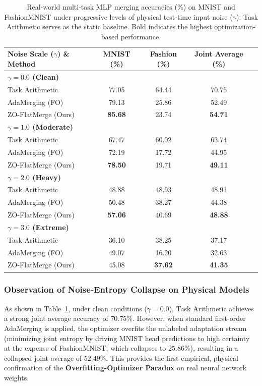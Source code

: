 \begin{table}[h]
\caption{Real-world multi-task MLP merging accuracies (\%) on MNIST and FashionMNIST under progressive levels of physical test-time input noise ($\gamma$). Task Arithmetic serves as the static baseline. Bold indicates the highest optimization-based performance.}
\label{tab:real_mnist_results}
\vskip 0.15in
\begin{center}
\begin{small}
\begin{sc}
\begin{tabular}{lcccc}
\toprule
Noise Scale ($\gamma$) \& Method & MNIST (\%) & Fashion (\%) & Joint Average (\%) \\
\midrule
\textbf{$\gamma = 0.0$ (Clean)} & & & \\
Task Arithmetic & 77.05 & 64.44 & 70.75 \\
AdaMerging (FO) & 79.13 & 25.86 & 52.49 \\
ZO-FlatMerge (Ours) & \textbf{85.68} & 23.74 & \textbf{54.71} \\
\midrule
\textbf{$\gamma = 1.0$ (Moderate)} & & & \\
Task Arithmetic & 67.47 & 60.02 & 63.74 \\
AdaMerging (FO) & 72.19 & 17.72 & 44.95 \\
ZO-FlatMerge (Ours) & \textbf{78.50} & 19.71 & \textbf{49.11} \\
\midrule
\textbf{$\gamma = 2.0$ (Heavy)} & & & \\
Task Arithmetic & 48.88 & 48.93 & 48.91 \\
AdaMerging (FO) & 50.48 & 38.27 & 44.38 \\
ZO-FlatMerge (Ours) & \textbf{57.06} & 40.69 & \textbf{48.88} \\
\midrule
\textbf{$\gamma = 3.0$ (Extreme)} & & & \\
Task Arithmetic & 36.10 & 38.25 & 37.17 \\
AdaMerging (FO) & 49.07 & 16.20 & 32.63 \\
ZO-FlatMerge (Ours) & 45.08 & \textbf{37.62} & \textbf{41.35} \\
\bottomrule
\end{tabular}
\end{sc}
\end{small}
\end{center}
\vskip -0.1in
\end{table}

\subsubsection{Observation of Noise-Entropy Collapse on Physical Models}
As shown in Table~\ref{tab:real_mnist_results}, under clean conditions ($\gamma=0.0$), Task Arithmetic achieves a strong joint average accuracy of $70.75\%$.
However, when standard first-order AdaMerging is applied, the optimizer overfits the unlabeled adaptation stream (minimizing joint entropy by driving MNIST head predictions to high certainty at the expense of FashionMNIST, which collapses to $25.86\%$), resulting in a collapsed joint average of $52.49\%$.
This provides the first empirical, physical confirmation of the \textbf{Overfitting-Optimizer Paradox} on real neural network weights.

